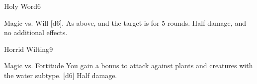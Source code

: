\begin{spellsection}{Holy Word}{6}
    \begin{spellheader}
    \end{spellheader}
    \begin{spellcontent}
        \begin{spelltargetinginfo}
        \end{spelltargetinginfo}
        \begin{spelleffects}
            \begin{spellattack}{Magic vs. Will}
                \spellsuccess {}[d6].
                \spellcritical As above, and the target is \dazed for 5 rounds.
                \spellfailure Half damage, and no additional effects.
            \end{spellattack}
        \end{spelleffects}
    \end{spellcontent}
    \begin{spellfooter}
        \miscastexplode
    \end{spellfooter}
\end{spellsection}

\begin{spellsection}{Horrid Wilting}{9}
    \begin{spellheader}
    \end{spellheader}
    \begin{spellcontent}
        \begin{spelltargetinginfo}
        \end{spelltargetinginfo}
        \begin{spelleffects}
            \begin{spellattack}{Magic vs. Fortitude}
                \spellspecial You gain a  bonus to attack against plants and creatures with the water subtype.
                \spellsuccess {}[d6]
                \spellfailure Half damage.
            \end{spellattack}
        \end{spelleffects}
    \end{spellcontent}
    \begin{spellfooter}
        \miscastyou
    \end{spellfooter}
\end{spellsection}

